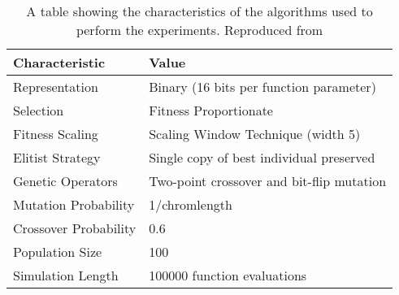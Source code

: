\begin{table} [h]
    \begin{tabular}{|l|l|}
        \hline
        \textbf{Characteristic}      & \textbf{Value}                       \\
        \hline
        Representation          & Binary (16 bits per function parameter)   \\
        Selection               & Fitness Proportionate                     \\
        Fitness Scaling         & Scaling Window Technique (width 5)        \\
        Elitist Strategy        & Single copy of best individual preserved  \\
        Genetic Operators       & Two-point crossover and bit-flip mutation \\
        Mutation Probability    & 1/chromlength                             \\
        Crossover Probability   & 0.6                                       \\
        Population Size         & 100                                       \\
        Simulation Length       & 100000 function evaluations               \\
        \hline

    \end{tabular}
    \caption{A table showing the characteristics of the algorithms used to perform the experiments. Reproduced from \cite{original-paper}}
    \label{tab:parameter-table}
\end{table}
